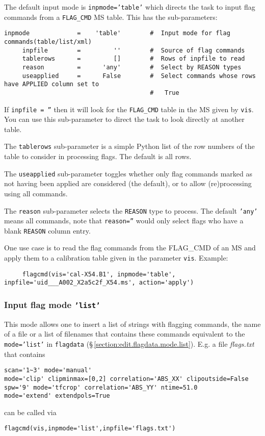 The default input mode is {\tt inpmode='table'} which directs the
task to input flag commands from a {\tt FLAG\_CMD} MS table.  
This has the sub-parameters:
\small
\begin{verbatim}
inpmode             =    'table'        #  Input mode for flag commands(table/list/xml)
     inpfile        =         ''        #  Source of flag commands
     tablerows      =         []        #  Rows of inpfile to read
     reason         =      'any'        #  Select by REASON types
     useapplied     =      False        #  Select commands whose rows have APPLIED column set to
                                        #   True
\end{verbatim}
\normalsize

If {\tt inpfile = ''} then it will look for the {\tt FLAG\_CMD} 
table in the MS given by {\tt vis}. You can use this sub-parameter to
direct the task to look directly at another table.

The {\tt tablerows} sub-parameter is a simple Python list of the row
numbers of the table to consider in processing flags.  The default is
all rows.

The {\tt useapplied} sub-parameter toggles whether only flag commands
marked as not having been applied are considered (the default), or
to allow (re)processing using all commands.

The {\tt reason} sub-parameter selects the {\tt REASON} type to
process.  The default {\tt 'any'} means all commands, note that
{\tt reason=''} would only select flags who have a blank {\tt REASON}
column entry.

One use case is to read the flag commands from the FLAG\_CMD of an MS
and apply them to a calibration table given in the parameter
{\tt vis}. Example:

\small
\begin{verbatim}
     flagcmd(vis='cal-X54.B1', inpmode='table', inpfile='uid___A002_X2a5c2f_X54.ms', action='apply')
\end{verbatim}
\normalsize

\subsubsection{Input flag mode {\tt 'list'}}
\label{section:edit.flagcmd.inpmode.list}
This mode allows one to insert a list of strings with ﬂagging
commands, the name of a ﬁle or a list of filenames that contains these
commands equivalent to the {\tt mode='list'} in {\tt flagdata}
(\S\,\ref{section:edit.flagdata.mode.list}). E.g. a file {\it
  flags.txt} that contains \small
\begin{verbatim}
scan='1~3' mode='manual'
mode='clip' clipminmax=[0,2] correlation='ABS_XX' clipoutside=False
spw='9' mode='tfcrop' correlation='ABS_YY' ntime=51.0
mode='extend' extendpols=True
\end{verbatim}
\normalsize
can be called via  
\small
\begin{verbatim}
flagcmd(vis,inpmode='list',inpfile='flags.txt')
\end{verbatim}
\normalsize

